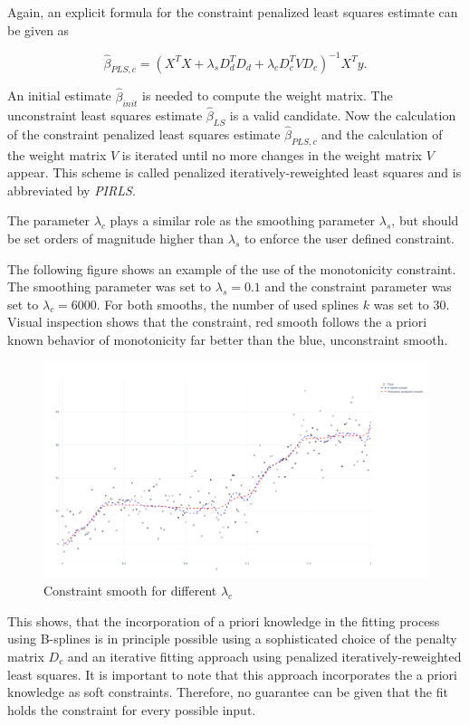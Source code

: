 \documentclass[10pt,a4paper]{article}
\begin{document}
	Again, an explicit formula for the constraint penalized least squares estimate can be given as
	
	$$\hat \beta_{PLS,c} = (X^TX + \lambda_s D_d^T D_d  + \lambda_c D_c^T V D_c)^{-1} X^T y.$$
	
	An initial estimate $\hat \beta_{init}$ is needed to compute the weight matrix. The unconstraint least squares estimate $\hat \beta_{LS}$ is a valid candidate. Now the calculation of the constraint penalized least squares estimate $\hat \beta_{PLS, c}$ and the calculation of the weight matrix $V$ is iterated until no more changes in the weight matrix $V$ appear. This scheme is called penalized iteratively-reweighted least squares and is abbreviated by \emph{PIRLS}. 
	
	The parameter $\lambda_c$ plays a similar role as the smoothing parameter $\lambda_s$, but should be set orders of magnitude higher than $\lambda_s$ to enforce the user defined constraint. 
	
	The following figure shows an example of the use of the monotonicity constraint. The smoothing parameter was set to $\lambda_s = 0.1$ and the constraint parameter was set to $\lambda_c = 6000$. For both smooths, the number of used splines $k$ was set to $30$. Visual inspection shows that the constraint, red smooth follows the a priori known behavior of monotonicity far better than the blue, unconstraint smooth.
	
	\begin{figure}[H]
		\centering
		\includegraphics[width=\linewidth]{thesisplots/inc_spline.pdf}
		\caption{Constraint smooth for different $\lambda_c$}
		\label{fig:incspline}
	\end{figure}	

	This shows, that the incorporation of a priori knowledge in the fitting process using B-splines is in principle possible using a sophisticated choice of the penalty matrix $D_c$ and an iterative fitting approach using penalized iteratively-reweighted least squares. It is important to note that this approach incorporates the a priori knowledge as soft constraints. Therefore, no guarantee can be given that the fit holds the constraint for every possible input. 
\end{document}
